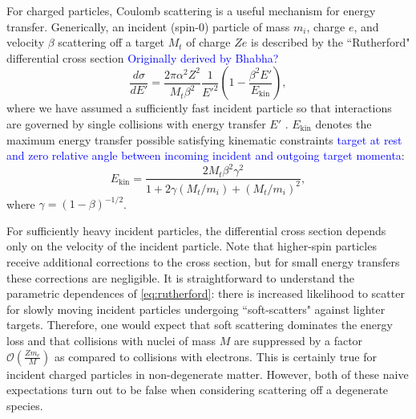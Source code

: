 \documentclass[11 pt,preprint,preprintnumbers,amsmath,amssymb, prd]{revtex4}
\newcommand{\OO}{\mathcal{O}}
\def\r{\right)}
\def\l{\left(}
\begin{document}
For charged particles, Coulomb scattering is a useful mechanism for energy transfer. Generically, an incident (spin-0) particle of mass $m_i$, charge $e$, and velocity $\beta$ scattering off a target $M_t$ of charge $Ze$ is described by the ``Rutherford" differential cross section \textcolor{blue}{Originally derived by Bhabha?}
\begin{equation}
\label{eq:rutherford}
\frac{d \sigma}{dE'} = \frac{2 \pi  \alpha^2 Z^2}{M_t \beta^2} \frac{1}{E'^2} \l1- \frac{\beta^2 E'}{E_{\text{kin}}}\r,
 \end{equation}
where we have assumed a sufficiently fast incident particle so that interactions are governed by single collisions with energy transfer $E'$ \cite{Agashe:2014kda}. $E_{\text{kin}}$ denotes the maximum energy transfer possible satisfying kinematic constraints \textcolor{blue}{target at rest and zero relative angle between incoming incident and outgoing target momenta}:
\begin{equation}
E_{\text{kin}} = \frac{2 M_t \beta^2 \gamma^2}{1+ 2\gamma(M_t/m_i) +(M_t/m_i)^2},
\end{equation}
where $\gamma = (1-\beta)^{-1/2}$.

For sufficiently heavy incident particles, the differential cross section depends only on the velocity of the incident particle. Note that higher-spin particles receive additional corrections to the cross section, but for small energy transfers these corrections are negligible. It is straightforward to understand the parametric dependences of \eqref{eq:rutherford}: there is increased likelihood to scatter for slowly moving incident particles undergoing ``soft-scatters" against lighter targets. Therefore, one would expect that soft scattering dominates the energy loss and that collisions with nuclei of mass $M$ are suppressed by a factor $\OO\l\frac{Z m_e}{M}\r$ as compared to collisions with electrons. This is certainly true for incident charged particles in non-degenerate matter. However, both of these naive expectations turn out to be false when considering scattering off a degenerate species.
\end{document}
